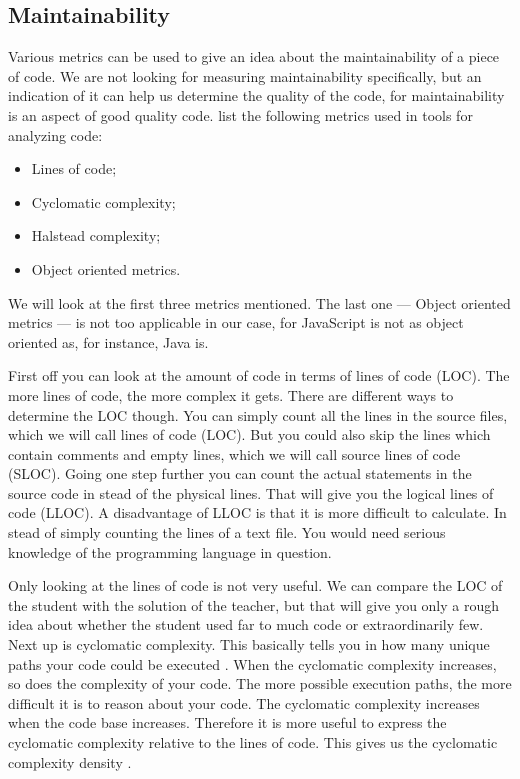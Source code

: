 \documentclass{article}
\begin{document}
\subsection{Maintainability}

Various metrics can be used to give an idea about the maintainability of a
piece of code. We are not looking for measuring maintainability specifically,
but an indication of it can help us determine the quality of the code, for
maintainability is an aspect of good quality code. \citet{rakic2013problems}
list the following metrics used in tools for analyzing code:
\begin{itemize}
  \item Lines of code;
  \item Cyclomatic complexity;
  \item Halstead complexity;
  \item Object oriented metrics.
\end{itemize}
We will look at the first three metrics mentioned. The last one --- Object
oriented metrics --- is not too applicable in our case, for JavaScript is not
as object oriented as, for instance, Java is.

First off you can look at the amount of code in terms of lines of code
(LOC). The more lines of code, the more complex it gets. There are different
ways to determine the LOC though. You can simply count all the lines in the
source files, which we will call lines of code (LOC). But you could also skip
the lines which contain comments and empty lines, which we will call source
lines of code (SLOC). Going one step further you can count the actual
statements in the source code in stead of the physical lines. That will give
you the logical lines of code (LLOC). A disadvantage of LLOC is that it is more
difficult to calculate. In stead of simply counting the lines of a text
file. You would need serious knowledge of the programming language in question.

Only looking at the lines of code is not very useful. We can compare the LOC of
the student with the solution of the teacher, but that will give you only a
rough idea about whether the student used far to much code or extraordinarily
few. Next up is cyclomatic complexity. This basically tells you in how many
unique paths your code could be executed \citep{website:js-complexity}. When
the cyclomatic complexity increases, so does the complexity of your code. The
more possible execution paths, the more difficult it is to reason about your
code. The cyclomatic complexity increases when the code base
increases. Therefore it is more useful to express the cyclomatic complexity
relative to the lines of code. This gives us the cyclomatic complexity density
\citep{gill1991cyclomatic}.
\end{document}

